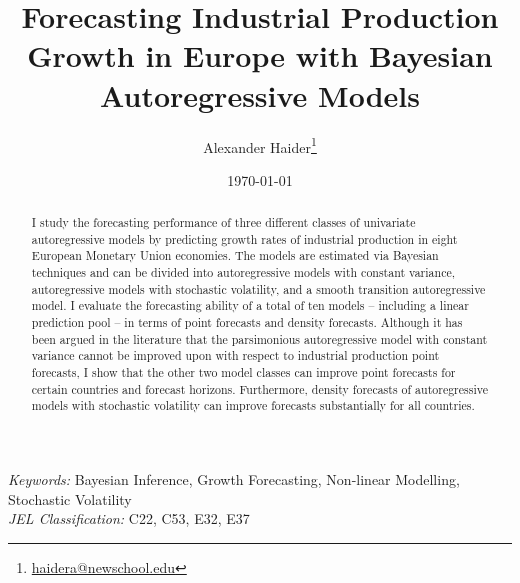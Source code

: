 \documentclass[12pt,letterpaper,fleqn]{article}           %
\begin{document}
\begin{titlepage}

\title{\textbf{Forecasting Industrial Production Growth in Europe with Bayesian Autoregressive Models}}


\renewcommand*{\Authsep}{, }
\renewcommand*{\Authand}{, }
\renewcommand*{\Authands}{, }
\renewcommand*{\Affilfont}{\small\normalfont}
\setlength{\affilsep}{2em}   %

\author[1]{Alexander Haider\thanks{\href{mailto:haidera@newschool.edu}{haidera@newschool.edu} }} %
\date{\mydate \today}
\maketitle
\thispagestyle{empty}

\vspace{-.5cm}
\begin{abstract}
\onehalfspacing

I study the forecasting performance of three different classes of univariate autoregressive models by predicting growth rates of industrial production in eight European Monetary Union economies. The models are estimated via Bayesian techniques and can be divided into autoregressive models with constant variance, autoregressive models with stochastic volatility, and a smooth transition autoregressive model. I evaluate the forecasting ability of a total of ten models -- including a linear prediction pool -- in terms of point forecasts and density forecasts. Although it has been argued in the literature that the parsimonious autoregressive model with constant variance cannot be improved upon with respect to industrial production point forecasts, I show that the other two model classes can improve point forecasts for certain countries and forecast horizons. Furthermore, density forecasts of autoregressive models with stochastic volatility can improve forecasts substantially for all countries.

\end{abstract} %

\onehalfspacing \small
\noindent \textit{Keywords:} Bayesian Inference, Growth Forecasting, Non-linear Modelling, Stochastic Volatility \\ \textit{JEL Classification:} C22, C53, E32, E37

\end{titlepage}
\end{document}
